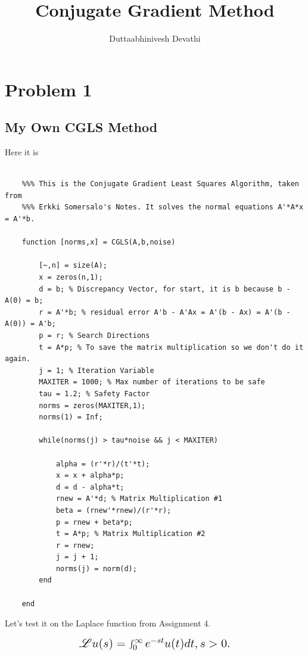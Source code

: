 \documentclass{article}
\title{Conjugate Gradient Method}
\author{Duttaabhinivesh Devathi}
\begin{document}
\maketitle
\tableofcontents

\section{Problem 1}

\subsection{My Own CGLS Method}

Here it is

\begin{verbatim}

    %%% This is the Conjugate Gradient Least Squares Algorithm, taken from
    %%% Erkki Somersalo's Notes. It solves the normal equations A'*A*x = A'*b.

    function [norms,x] = CGLS(A,b,noise)

        [~,n] = size(A);
        x = zeros(n,1);
        d = b; % Discrepancy Vector, for start, it is b because b - A(0) = b;
        r = A'*b; % residual error A'b - A'Ax = A'(b - Ax) = A'(b - A(0)) = A'b;
        p = r; % Search Directions
        t = A*p; % To save the matrix multiplication so we don't do it again.
        j = 1; % Iteration Variable
        MAXITER = 1000; % Max number of iterations to be safe
        tau = 1.2; % Safety Factor
        norms = zeros(MAXITER,1);
        norms(1) = Inf;

        while(norms(j) > tau*noise && j < MAXITER)

            alpha = (r'*r)/(t'*t);
            x = x + alpha*p;
            d = d - alpha*t;
            rnew = A'*d; % Matrix Multiplication #1
            beta = (rnew'*rnew)/(r'*r);
            p = rnew + beta*p;
            t = A*p; % Matrix Multiplication #2
            r = rnew;
            j = j + 1;
            norms(j) = norm(d);
        end

    end

\end{verbatim}

Let's test it on the Laplace function from Assignment 4.

\begin{equation}
\mbox{\Large\(
\mathscr{L} u(s) = \int_0^{\infty} e^{-st}u(t)dt,   s > 0.
\)}
\end{equation}
\end{document}
